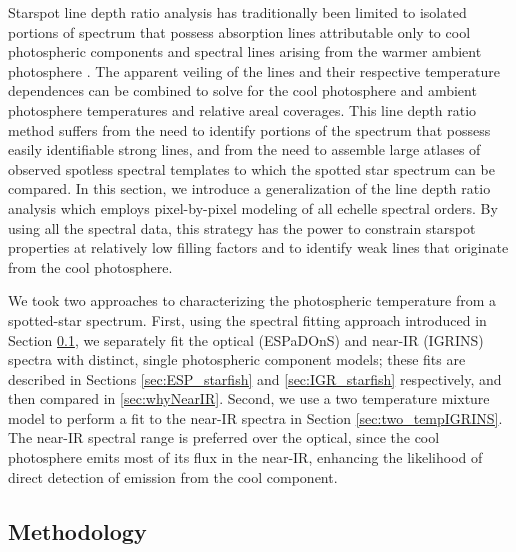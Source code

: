 \documentclass[twocolumn]{emulateapj}%
\begin{document}
Starspot line depth ratio analysis has traditionally been limited to isolated portions of spectrum that possess absorption lines attributable only to cool photospheric components and spectral lines arising from the warmer ambient photosphere \citep[\emph{e.g.}][]{neff95, oneal01}.  The apparent veiling of the lines and their respective temperature dependences can be combined to solve for the cool photosphere and ambient photosphere temperatures and relative areal coverages.  This line depth ratio method suffers from the need to identify portions of the spectrum that possess easily identifiable strong lines, and from the need to assemble large atlases of observed spotless spectral templates to which the spotted star spectrum can be compared.  In this section, we introduce a generalization of the line depth ratio analysis which employs pixel-by-pixel modeling of all echelle spectral orders.  By using all the spectral data, this strategy has the power to constrain starspot properties at relatively low filling factors and to identify weak lines that originate from the cool photosphere.

We took two approaches to characterizing the photospheric temperature from a spotted-star spectrum.  First, 
using the spectral fitting approach introduced in Section \ref{sec:methods}, we separately fit the optical (ESPaDOnS) and near-IR (IGRINS) spectra with distinct, single photospheric component models; these fits are described in Sections \ref{sec:ESP_starfish} and \ref{sec:IGR_starfish} respectively, and then compared in \ref{sec:whyNearIR}.
Second, we use a two temperature mixture model to perform a fit to the near-IR spectra in Section \ref{sec:two_tempIGRINS}.  The near-IR spectral range is preferred over the optical, since the cool photosphere emits most of its flux in the near-IR, enhancing the likelihood of direct detection of emission from the cool component.  


\subsection{Methodology}\label{sec:methods} 
\end{document}
